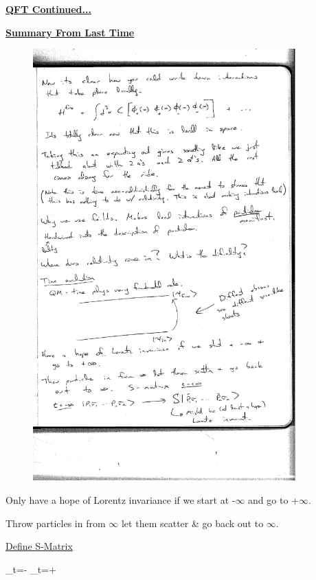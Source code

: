 {\fontsize{14}{16}\selectfont

\textbf{\underline{QFT Continued...}} 

{\Large \underline{\textbf{Summary From Last Time}}}


\begin{figure}[h]
\centering
\includegraphics[width=0.9\textwidth]{./TimeEvolution.pdf}
\end{figure}

Only have a hope of Lorentz invariance if we start at -$\infty$ and go to +$\infty$.

Throw particles in from $\infty$ let them scatter \& go back out to $\infty$.

\underline{Define S-Matrix}

\be
{}_{t=-\infty} \rightarrow {}_{t=+\infty}
\ee

}
